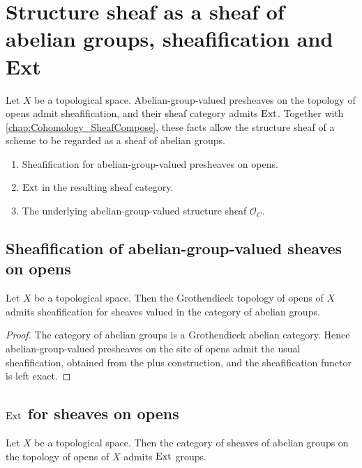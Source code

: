 \chapter{Structure sheaf as a sheaf of abelian groups, sheafification and Ext}
\label{chap:Cohomology_StructureSheafAb}

Let \(X\) be a topological space. Abelian-group-valued presheaves on the topology of opens admit sheafification, and their sheaf category admits \(\operatorname{Ext}\). Together with \cref{chap:Cohomology_SheafCompose}, these facts allow the structure sheaf of a scheme to be regarded as a sheaf of abelian groups.

\begin{enumerate}
  \item Sheafification for abelian-group-valued presheaves on opens.
  \item \(\operatorname{Ext}\) in the resulting sheaf category.
  \item The underlying abelian-group-valued structure sheaf \(\mathcal O_C\).
\end{enumerate}

\section{Sheafification of abelian-group-valued sheaves on opens}

\begin{theorem}\leanok
  \label{thm:HasSheafify_Opens_AddCommGrp}
  Let \(X\) be a topological space. Then the Grothendieck topology of opens of \(X\) admits sheafification for sheaves valued in the category of abelian groups.
\end{theorem}

\begin{proof}


\leanok
  The category of abelian groups is a Grothendieck abelian category. Hence abelian-group-valued presheaves on the site of opens admit the usual sheafification, obtained from the plus construction, and the sheafification functor is left exact.
\end{proof}

\section{\(\operatorname{Ext}\) for sheaves on opens}

\begin{theorem}\leanok
  \label{thm:HasExt_Sheaf_Opens_AddCommGrp}

  Let \(X\) be a topological space. Then the category of sheaves of abelian groups on the topology of opens of \(X\) admits \(\operatorname{Ext}\) groups.
\end{theorem}

